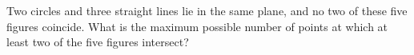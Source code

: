 Two circles and three straight lines lie in the same plane, and no two of these five figures coincide. What is the maximum possible number of points at which at least two of the five figures intersect?
